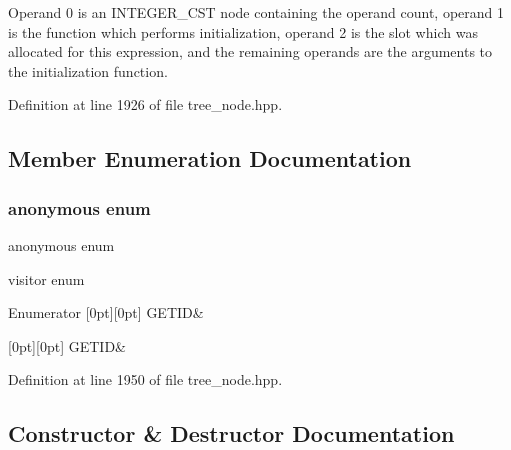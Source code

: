Operand 0 is an I\+N\+T\+E\+G\+E\+R\+\_\+\+C\+ST node containing the operand count, operand 1 is the function which performs initialization, operand 2 is the slot which was allocated for this expression, and the remaining operands are the arguments to the initialization function. 

Definition at line 1926 of file tree\+\_\+node.\+hpp.



\subsection{Member Enumeration Documentation}
\mbox{\label{structaggr__init__expr_a64d72b4bc2275c499fdb0f20ed45cdab}} 
\subsubsection{\texorpdfstring{anonymous enum}{anonymous enum}}
{\footnotesize\ttfamily anonymous enum}



visitor enum 

\begin{DoxyEnumFields}{Enumerator}
[0pt][0pt]{}\mbox{\label{structaggr__init__expr_a64d72b4bc2275c499fdb0f20ed45cdaba6678e6440180ee3622f3d4108d901370}} 
G\+E\+T\+ID&\\
\hline

[0pt][0pt]{}\mbox{\label{structaggr__init__expr_a64d72b4bc2275c499fdb0f20ed45cdaba6678e6440180ee3622f3d4108d901370}} 
G\+E\+T\+ID&\\
\hline

\end{DoxyEnumFields}


Definition at line 1950 of file tree\+\_\+node.\+hpp.



\subsection{Constructor \& Destructor Documentation}
\mbox{\label{structaggr__init__expr_acd64e3e854ae974b507a2950b8fd60fd}} 
